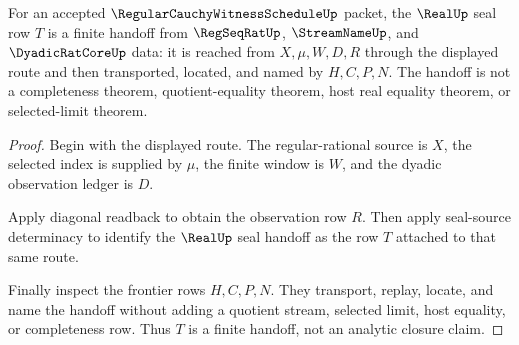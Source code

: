 \begin{theorem}
\label{thm:regularcauchywitnessschedule-real-handoff}
For an accepted $\RegularCauchyWitnessScheduleUp$ packet, the $\RealUp$ seal row $T$ is a finite handoff from $\RegSeqRatUp$, $\StreamNameUp$, and $\DyadicRatCoreUp$ data: it is reached from $X,\mu,W,D,R$ through the displayed route and then transported, located, and named by $H,C,P,N$. The handoff is not a completeness theorem, quotient-equality theorem, host real equality theorem, or selected-limit theorem.
\end{theorem}
\begin{proof}
Begin with the displayed route. The regular-rational source is $X$, the selected index is supplied by $\mu$, the finite window is $W$, and the dyadic observation ledger is $D$.

Apply diagonal readback to obtain the observation row $R$. Then apply seal-source determinacy to identify the $\RealUp$ seal handoff as the row $T$ attached to that same route.

Finally inspect the frontier rows $H,C,P,N$. They transport, replay, locate, and name the handoff without adding a quotient stream, selected limit, host equality, or completeness row. Thus $T$ is a finite handoff, not an analytic closure claim.
\end{proof}

